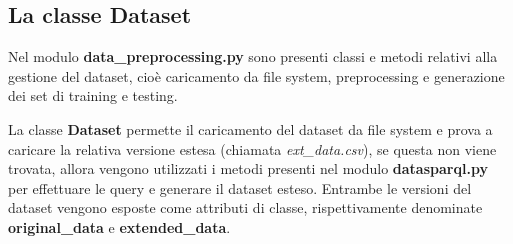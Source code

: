 \documentclass{article}
\begin{document}
\subsection{La classe Dataset}
Nel modulo \textbf{data\_preprocessing.py} sono presenti classi e metodi
relativi alla gestione del dataset, cioè caricamento da file system,
preprocessing e generazione dei set di training e testing.

La classe \textbf{Dataset} permette il caricamento del dataset da file system e
prova a caricare la relativa versione estesa (chiamata \textit{ext\_data.csv}),
se questa non viene trovata, allora vengono utilizzati i metodi presenti nel
modulo \textbf{datasparql.py} per effettuare le query e generare il dataset
esteso. Entrambe le versioni del dataset vengono esposte come attributi di
classe, rispettivamente denominate \textbf{original\_data} e
\textbf{extended\_data}.
\end{document}
